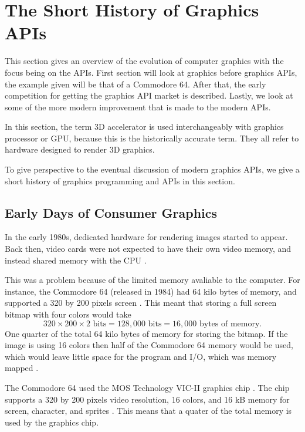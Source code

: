 \section{The Short History of Graphics \acs{API}s}\label{sec:short_history}
\begin{sectionmeta}
	This section gives an overview of the evolution of computer graphics with the focus being on the \glspl{API}.
	First section will look at graphics before graphics \glspl{API}, the example given will be that of a Commodore 64.
	After that, the early competition for getting the graphics \gls{API} market is described.
	Lastly, we look at some of the more modern improvement that is made to the modern \glspl{API}.
	
	In this section, the term 3D accelerator is used interchangeably with graphics processor or \gls{GPU}, because this is the historically accurate term. 
	They all refer to hardware designed to render 3D graphics.
\end{sectionmeta}

To give perspective to the eventual discussion of modern graphics \glspl{API}, we give a short history of graphics programming and \glspl{API} in this section.

\subsection{Early Days of Consumer Graphics}

In the early 1980s, dedicated hardware for rendering images started to appear.
Back then, video cards were not expected to have their own video memory, and instead shared memory with the \gls{CPU} \cite{wikipedia????shared}.

This was a problem because of the limited memory avaliable to the computer.
For instance, the Commodore 64 (released in 1984) had 64 kilo bytes of memory, and supported a 320 by 200 pixels screen \cite{commodore1983commodore}.
This meant that storing a full screen bitmap with four colors would take $$320\times 200\times 2 \text{ bits} = 128,000 \text{ bits} = 16,000 \text{ bytes of memory.}$$
One quarter of the total 64 kilo bytes of memory for storing the bitmap.
If the image is using 16 colors then half of the Commodore 64 memory would be used, which would leave little space for the program and I/O, which was memory mapped \cite{commodore1983commodore}.

The Commodore 64 used the MOS Technology VIC-II graphics chip \cite{commodore1983commodore}.
The chip supports a 320 by 200 pixels video resolution, 16 colors, and 16 kB memory for screen, character, and sprites \cite{commodore1983commodore} .
This means that a quater of the total memory is used by the graphics chip.


